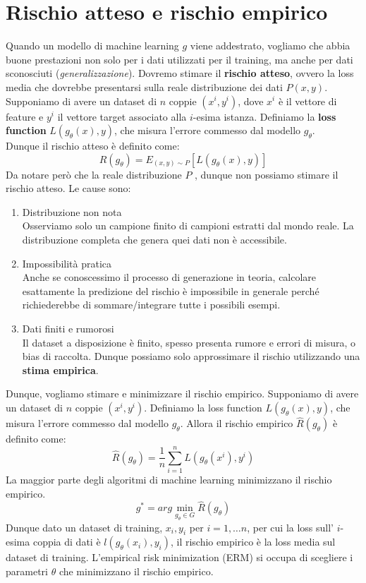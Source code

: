 \documentclass{../main.tex}[subfiles]
\begin{document}
\section{Rischio atteso e rischio empirico}
Quando un modello di machine learning $g$ viene addestrato, vogliamo che abbia buone prestazioni non solo per i dati utilizzati per il training, ma anche per dati sconosciuti (\textit{generalizzazione}).
Dovremo stimare il \textbf{rischio atteso}, ovvero la loss media che dovrebbe presentarsi sulla reale distribuzione dei dati $P(x,y)$. 
\\
Supponiamo di avere un dataset di $n$ coppie $(x^i,y^i)$, dove $x^i$ è il vettore di feature e $y^i$ il vettore target associato alla $i$-esima istanza.
Definiamo la \textbf{loss function} $L(g_\theta(x),y)$, che misura l'errore commesso dal modello $g_\theta$.
\\
Dunque il rischio atteso è definito come:
$$R(g_\theta)=E_{(x,y)\sim P}[L(g_\theta(x),y)]$$
Da notare però che la reale distribuzione $P$ , dunque non possiamo stimare il rischio atteso. Le cause sono:
\begin{enumerate}
	\item Distribuzione non nota \\
		Osserviamo solo un campione finito di campioni estratti dal mondo reale. La distribuzione completa che genera quei dati non è accessibile.
	\item Impossibilità pratica\\
		Anche se conoscessimo il processo di generazione in teoria, calcolare esattamente la predizione del rischio è impossibile in generale perché richiederebbe di sommare/integrare tutte i possibili esempi.
	\item Dati finiti e rumorosi\\
		Il dataset a disposizione è finito, spesso presenta rumore e errori di misura, o bias di raccolta. Dunque possiamo solo approssimare il rischio utilizzando una \textbf{stima empirica}.
\end{enumerate}
Dunque, vogliamo stimare e minimizzare il rischio empirico. Supponiamo di avere un dataset di $n$ coppie $(x^i,y^i)$.
Definiamo la loss function $L(g_\theta(x),y)$, che misura l'errore commesso dal modello $g_\theta$.
Allora il rischio empirico $\hat{R}(g_\theta)$ è definito come:
$$\hat{R}(g_\theta)=\frac{1}{n}\sum_{i=1}^n L(g_\theta(x^i),y^i)$$
La maggior parte degli algoritmi di machine learning minimizzano il rischio empirico.
$$g^*=arg\min_{g_\theta\in G}\hat{R}(g_\theta)$$
Dunque dato un dataset di training, $x_i,y_i$ per $i=1,\dots n$, per cui la loss sull' $i$-esima coppia di dati è $l(g_\theta(x_i),y_i)$, il rischio empirico è la loss media sul dataset di training.
L'empirical risk minimization (ERM) si occupa di scegliere i parametri $\theta$ che minimizzano il rischio empirico.
\end{document}

